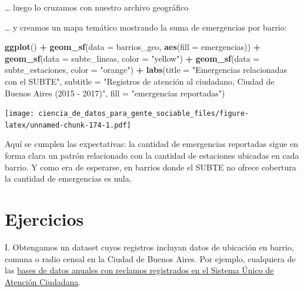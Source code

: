\documentclass[spanish,]{book}
\newenvironment{Shaded}{\begin{snugshade}}{\end{snugshade}}
\newcommand{\DataTypeTok}[1]{\textcolor[rgb]{0.13,0.29,0.53}{#1}}
\newcommand{\KeywordTok}[1]{\textcolor[rgb]{0.13,0.29,0.53}{\textbf{#1}}}
\newcommand{\NormalTok}[1]{#1}
\newcommand{\OperatorTok}[1]{\textcolor[rgb]{0.81,0.36,0.00}{\textbf{#1}}}
\newcommand{\StringTok}[1]{\textcolor[rgb]{0.31,0.60,0.02}{#1}}
\begin{document}
\ldots{} luego lo cruzamos con nuestro archivo geográfico

\begin{Shaded}
\end{Shaded}

\ldots{} y creamos un mapa temático mostrando la suma de emergencias por barrio:

\begin{Shaded}
\begin{Highlighting}[]
\KeywordTok{ggplot}\NormalTok{() }\OperatorTok{+}
\StringTok{    }\KeywordTok{geom_sf}\NormalTok{(}\DataTypeTok{data =}\NormalTok{ barrios_geo, }\KeywordTok{aes}\NormalTok{(}\DataTypeTok{fill =}\NormalTok{ emergencias)) }\OperatorTok{+}
\StringTok{    }\KeywordTok{geom_sf}\NormalTok{(}\DataTypeTok{data =}\NormalTok{ subte_lineas, }\DataTypeTok{color =} \StringTok{"yellow"}\NormalTok{) }\OperatorTok{+}
\StringTok{    }\KeywordTok{geom_sf}\NormalTok{(}\DataTypeTok{data =}\NormalTok{ subte_estaciones, }\DataTypeTok{color =} \StringTok{"orange"}\NormalTok{) }\OperatorTok{+}
\StringTok{    }\KeywordTok{labs}\NormalTok{(}\DataTypeTok{title =} \StringTok{"Emergencias relacionadas con el SUBTE"}\NormalTok{,}
         \DataTypeTok{subtitle =} \StringTok{"Registros de atención al ciudadano, Ciudad de Buenos Aires (2015 - 2017)"}\NormalTok{,}
         \DataTypeTok{fill =} \StringTok{"emergencias reportadas"}\NormalTok{)}
\end{Highlighting}
\end{Shaded}

\texttt{[image: ciencia\_de\_datos\_para\_gente\_sociable\_files/figure-latex/unnamed-chunk-174-1.pdf]}

Aquí se cumplen las expectativas: la cantidad de emergencias reportadas sigue en forma clara un patrón relacionado con la cantidad de estaciones ubicadas en cada barrio. Y como era de esperarse, en barrios donde el SUBTE no ofrece cobertura la cantidad de emergencias es nula.

\hypertarget{ejercicios-4}{%
\section{Ejercicios}\label{ejercicios-4}}

I. Obtengamos un dataset cuyos registros incluyan datos de ubicación en barrio, comuna o radio censal en la Ciudad de Buenos Aires. Por ejemplo, cualquiera de las \href{https://data.buenosaires.gob.ar/dataset/sistema-unico-atencion-ciudadana}{bases de datos anuales con reclamos registrados en el Sistema Único de Atención Ciudadana}.
\end{document}
